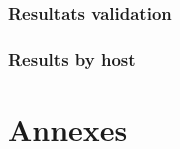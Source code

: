 \documentclass[a4paper,11pt]{report}
\begin{document}
\subsection{Resultats validation}
\subsection{Results by host}

\addtocounter{chapter}{1}


\chapter{Annexes}
\end{document}
